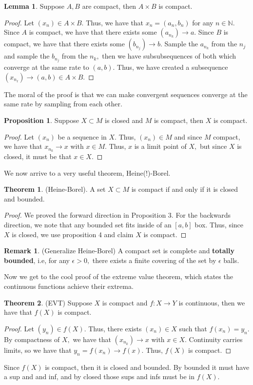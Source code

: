 \documentclass[10pt, oneside]{article}
\newcommand{\bbN}{\mathbb{N}}
\theoremstyle{definition}
\newtheorem{thm}{Theorem}
\newtheorem{prop}{Proposition}
\newtheorem{rem}{Remark}
\newtheorem{lem}{Lemma}
\begin{document}
\begin{lem}
        Suppose $A, B$ are compact, then $A \times B$ is compact.
\end{lem}
\begin{proof}
Let $(x_n) \in A \times B.$ Thus, we have that $x_n = (a_n, b_n)$ for any $n \in \bbN.$ Since $A$ is compact, we have that there exists some $(a_{n_k}) \to a.$ Since $B$ is compact, we have that there exists some $(b_{n_j}) \to b.$ Sample the $a_{n_k}$ from the $n_j$ and sample the $b_{n_j}$ from the $n_k,$ then we have subsubsequences of both which converge at the same rate to $(a,b).$ Thus, we have created a subsequence $(x_{n_{\ell}}) \to (a,b)\in A \times B.$ 
\end{proof}
The moral of the proof is that we can make convergent sequences converge at the same rate by sampling from each other.
\begin{prop}
    Suppose $X \subset M$ is closed and $M$ is compact, then $X$ is compact.
\end{prop}
\begin{proof}
    Let $(x_n)$ be a sequence in $X.$ Thus, $(x_n)\in M$ and since $M$ compact, we have that $x_{n_k} \to x$ with $x\in M.$ Thus, $x$ is a limit point of $X,$ but since $X$ is closed, it must be that $x \in X.$
\end{proof}
We now arrive to a very useful theorem, Heine(!)-Borel.
\begin{thm}
    (Heine-Borel). A set $X \subset M$ is compact if and only if it is closed and bounded.
\end{thm}
\begin{proof}
    We proved the forward direction in Proposition 3. For the backwards direction, we note that any bounded set fits inside of an $[a,b]$ box. Thus, since $X$ is closed, we use proposition 4 and claim $X$ is compact.
\end{proof}
\begin{rem}
    (Generalize Heine-Borel) A compact set is complete and \textbf{totally bounded}, i.e, for any $\epsilon>0,$ there exists a finite covering of the set by $\epsilon$ balls.
\end{rem}

Now we get to the cool proof of the extreme value theorem, which states the continuous functions achieve their extrema.
\begin{thm}
    (EVT) Suppose $X$ is compact and $f: X \to Y$ is continuous, then we have that $f(X)$ is compact.
\end{thm}
\begin{proof}
    Let $(y_n)\in f(X).$ Thus, there exists $(x_n)\in X$ such that $f(x_n)= y_n.$ By compactness of $X,$ we have that $(x_{n_k}) \to x$ with $x\in X.$ Continuity carries limits, so we have that $y_n = f(x_n) \to f(x).$ Thus, $f(X)$ is compact.
\end{proof}
Since $f(X)$ is compact, then it is closed and bounded. By bounded it must have a sup and and inf, and by closed those sups and infs must be in $f(X).$
\newpage
\end{document}
